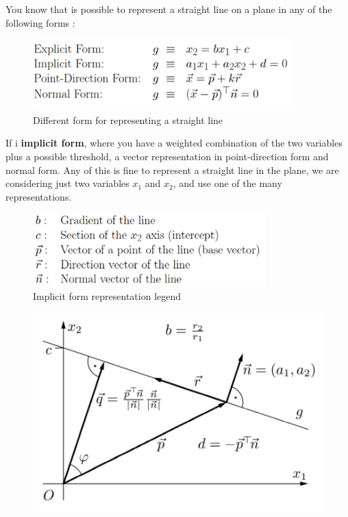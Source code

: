 \documentclass{article}
\begin{document}
You know that is possible to represent a straight line on a plane in any of
the following forms :
\begin{figure}[H]
    \centering
    \includegraphics[width=10cm]{images/geom_interp.png}
    \caption{Different form for representing a straight line}
    \label{fig:line_repr}
\end{figure}

If i \textbf{implicit form}, where you have a weighted combination of the two variables plus a
possible threshold, a vector representation in point-direction form and normal form.
Any of this is fine to represent a straight line in the plane, we are considering just
two variables $x_1$ and $x_2$, and use one of the many representations.

\begin{figure}[H]
    \centering
    \includegraphics[width=9cm]{images/geom_interp_impl.png}
    \caption{Implicit form representation legend}
    \label{fig:line_impl_form_legend}
\end{figure}

\begin{figure}[H]
    \centering
    \includegraphics[scale=1]{images/geom1.png}
    \label{fig:geom_1}
\end{figure}
\end{document}
